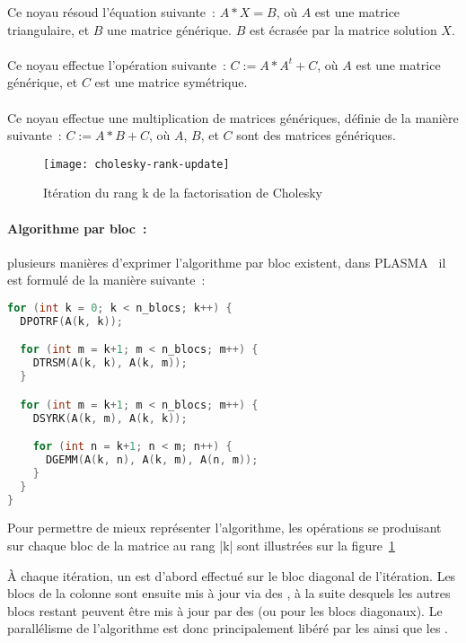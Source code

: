 Ce noyau résoud l'équation suivante~: $A*X = B$, où $A$ est une matrice triangulaire, et $B$ une matrice générique. $B$ est écrasée par la matrice solution $X$.

\paragraph{}

Ce noyau effectue l'opération suivante~: $C := A*A^t + C$, où $A$ est une matrice générique, et $C$ est une matrice symétrique.

\paragraph{}

Ce noyau effectue une multiplication de matrices génériques, définie de la manière suivante~: $C := A*B + C$, où $A$, $B$, et $C$ sont des matrices génériques.

\begin{figure}[h]
  \centering
  \texttt{[image: cholesky-rank-update]}
  \caption{Itération du rang k de la factorisation de Cholesky}\label{fig:contribs:apps:cholesky:rank-update}
\end{figure}

\paragraph{Algorithme par bloc~:} plusieurs manières d'exprimer l'algorithme par bloc existent, dans PLASMA~\cite{Kurzak2013} il est formulé de la manière suivante~:

\begin{lstlisting}[language=c++]
for (int k = 0; k < n_blocs; k++) {
  DPOTRF(A(k, k));

  for (int m = k+1; m < n_blocs; m++) {
    DTRSM(A(k, k), A(k, m));
  }

  for (int m = k+1; m < n_blocs; m++) {
    DSYRK(A(k, m), A(k, k));

    for (int n = k+1; n < m; n++) {
      DGEMM(A(k, n), A(k, m), A(n, m));
    }
  }
}
\end{lstlisting}

Pour permettre de mieux représenter l'algorithme, les opérations se produisant sur chaque bloc de la matrice au rang |k| sont illustrées sur la figure~\ref{fig:contribs:apps:cholesky:rank-update}


À chaque itération, un \potrf est d'abord effectué sur le bloc diagonal de l'itération. Les blocs de la colonne sont ensuite mis à jour via des \trsm, à la suite desquels les autres blocs restant peuvent être mis à jour par des \gemm (ou \syrk pour les blocs diagonaux).
Le parallélisme de l'algorithme est donc principalement libéré par les \potrf ainsi que les \trsm.

